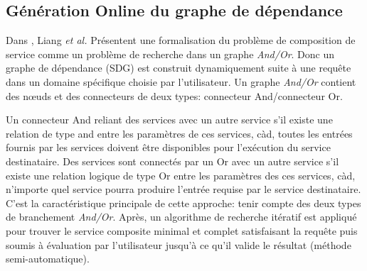 

  \subsection{Génération Online du graphe de dépendance}
  \label{sec:generation-online}

  Dans \cite{liang2005and}, Liang \textit{et al.}  Présentent une
  formalisation du problème de composition de service comme un
  problème de recherche dans un graphe \textit{And/Or}. Donc un graphe
  de dépendance (SDG) est construit dynamiquement suite à une requête
  dans un domaine spécifique choisie par l'utilisateur. Un graphe
  \textit{And/Or} contient des nœuds et des connecteurs de deux types:
  connecteur And/connecteur Or.

  Un connecteur And reliant des services avec un autre service s'il
  existe une relation de type and entre les paramètres de ces
  services, càd, toutes les entrées fournis par les services doivent
  être disponibles pour l'exécution du service destinataire. Des
  services sont connectés par un Or avec un autre service s'il existe
  une relation logique de type Or entre les paramètres des ces
  services, càd, n'importe quel service pourra produire l'entrée
  requise par le service destinataire. C'est la caractéristique
  principale de cette approche: tenir compte des deux types de
  branchement \textit{And/Or}.  Après, un algorithme de recherche
  itératif est appliqué pour trouver le service composite minimal et
  complet satisfaisant la requête puis soumis à évaluation par
  l'utilisateur jusqu'à ce qu'il valide le résultat (méthode
  semi-automatique).

